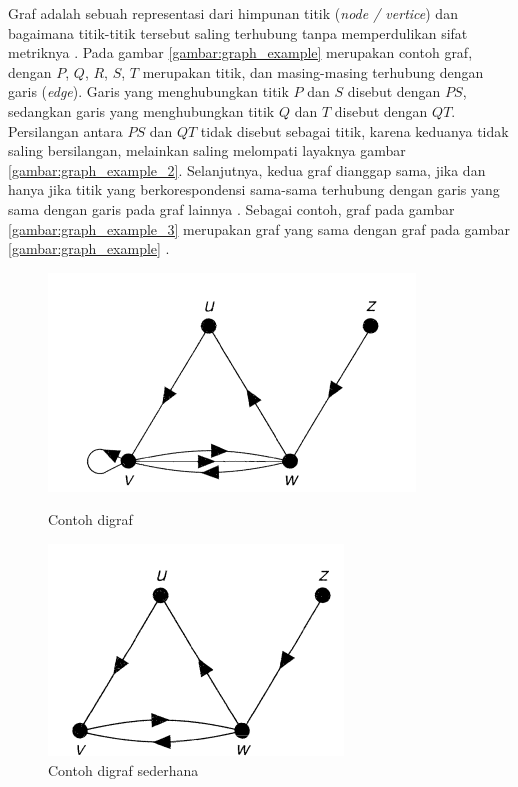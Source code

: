 Graf adalah sebuah representasi dari himpunan titik (\textit{node / vertice}) dan bagaimana titik-titik tersebut saling terhubung tanpa memperdulikan sifat metriknya \citep{wilson1996}. Pada gambar \ref{gambar:graph_example} merupakan contoh graf, dengan $P$, $Q$, $R$, $S$, $T$ merupakan titik, dan masing-masing terhubung dengan garis (\textit{edge}). Garis yang menghubungkan titik $P$ dan $S$ disebut dengan $PS$, sedangkan garis yang menghubungkan titik $Q$ dan $T$ disebut dengan $QT$. Persilangan antara $PS$ dan $QT$ tidak disebut sebagai titik, karena keduanya tidak saling bersilangan, melainkan saling melompati layaknya gambar \ref{gambar:graph_example_2}. Selanjutnya, kedua graf dianggap sama, jika dan hanya jika titik yang berkorespondensi sama-sama terhubung dengan garis yang sama dengan garis pada graf lainnya \citep{wilson1996}. Sebagai contoh, graf pada gambar \ref{gambar:graph_example_3} merupakan graf yang sama dengan graf pada gambar \ref{gambar:graph_example} \citep{wilson1996}. 


\begin{figure}[!htb]
\begin{minipage}{0.48\textwidth}
	\centering
	\includegraphics[width=.7\linewidth]{gambar/digraph_example}
	\caption{Contoh digraf \citep{wilson1996}}
	\label{gambar:digraph_example}
\end{minipage}\hfill
\begin{minipage}{0.48\textwidth}
	\centering
	\includegraphics[width=.7\linewidth]{gambar/simple_digraph_example}
	\caption{Contoh digraf sederhana \citep{wilson1996}}
	\label{gambar:simple_digraph_example}
\end{minipage}
\end{figure}

